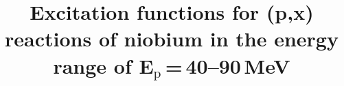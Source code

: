 \documentclass[3p]{elsarticle}
\begin{document}
\begin{frontmatter}
\title{Excitation functions for (p,x) reactions of niobium in the energy range of E\texorpdfstring{$_{\text{p}}$\,=\,40--90\,}{Ep = 40--90 }MeV}




% 
% 
% 
% 
% 
% 
% 
% 
% 
% 
% 

% 








\end{frontmatter}
\end{document}
